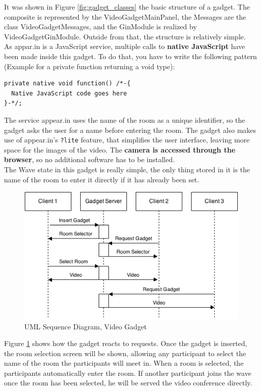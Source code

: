 It was shown in Figure \ref{fig:gadget_classes} the basic structure of a gadget. The composite is represented by the VideoGadgetMainPanel, the Messages are the class VideoGadgetMessages, and the GinModule is realized by VideoGadgetGinModule. Outside from that, the structure is relatively simple.\\[.2cm]
As appar.in is a JavaScript service, multiple calls to \textbf{native JavaScript} have been made inside this gadget. To do that, you have to write the following pattern (Example for a private function returning a void type):
\begin{verbatim}
private native void function() /*-{
  Native JavaScript code goes here
}-*/;
\end{verbatim}
The service appear.in uses the name of the room as a unique identifier, so the gadget asks the user for a name before entering the room. The gadget also makes use of appear.in's \verb|?lite| feature, that simplifies the user interface, leaving more space for the images of the video. The \textbf{camera is accessed through the browser}, so no additional software has to be installed.\\[.2cm]
The Wave state in this gadget is really simple, the only thing stored in it is the name of the room to enter it directly if it has already been set.\\[.2cm]
\begin{figure}[h]
  \center
    \includegraphics[keepaspectratio, scale=0.6]{Media/Diagrams/Gadget/VideoSequence.png}
  \caption{UML Sequence Diagram, Video Gadget}
  \label{fig:video_gadget_sequence}
\end{figure}
Figure \ref{fig:video_gadget_sequence} shows how the gadget reacts to requests. Once the gadget is inserted, the room selection screen will be shown, allowing any participant to select the name of the room the participants will meet in. When a room is selected, the participants automatically enter the room. If another participant joins the wave once the room has been selected, he will be served the video conference directly.
